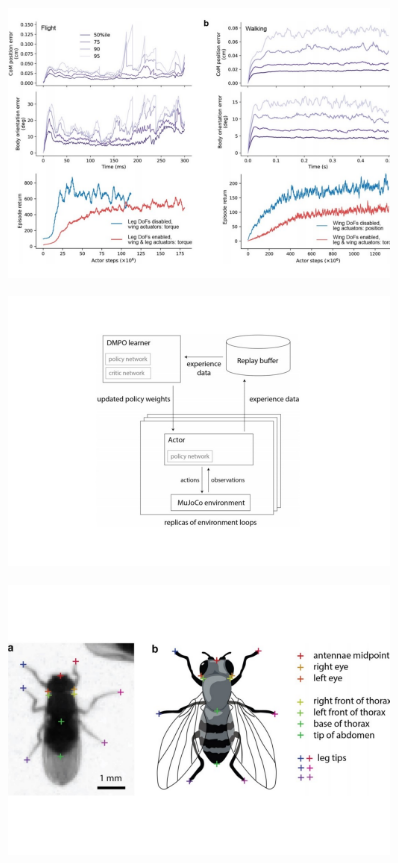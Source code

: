 \documentclass[sn-mathphys-num]{sn-jnl}%
\theoremstyle{thmstyleone}%
\theoremstyle{thmstyletwo}%
\theoremstyle{thmstylethree}%
\begin{document}
\begin{figure}[!htb] 
	\centering
	\includegraphics[width=0.9\textwidth]{fig/extended_fig_6.pdf}
	\caption{}
	\label{fig:extended_fig_6}
\end{figure}


\begin{figure}[!htb] 
	\centering
	\includegraphics[width=0.9\textwidth]{fig/extended_fig_7.pdf}
	\caption{}
	\label{fig:extended_fig_7}
\end{figure}


\begin{figure}[!htb] 
	\centering
	\includegraphics[width=0.9\textwidth]{fig/extended_fig_8.pdf}
	\caption{}
	\label{fig:extended_fig_8}
\end{figure}
\end{document}
